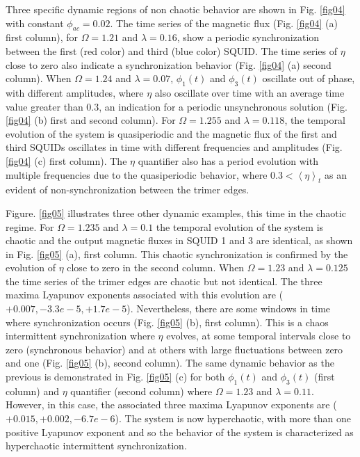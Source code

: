 \documentclass[aps,pre,reprint,groupedaddress]{revtex4-1}
\begin{document}
Three specific dynamic regions of non chaotic behavior are shown in Fig. \ref{fig04} with constant $\phi_{ac} = 0.02$. The time series of the magnetic flux (Fig. \ref{fig04} (a) first column), for $\Omega = 1.21$ and $\lambda=0.16$, show a periodic synchronization between the first (red color) and third (blue color) SQUID. The time series of $\eta$ close to zero also indicate a synchronization behavior (Fig. \ref{fig04} (a) second column). When $\Omega = 1.24$ and $\lambda=0.07$, $\phi_{1}(t)$ and $\phi_{3}(t)$ oscillate out of phase, with different amplitudes, where $\eta$ also oscillate over time with an average time value greater than $0.3$, an indication for a periodic unsynchronous solution (Fig. \ref{fig04} (b) first and second column). For $\Omega = 1.255$ and $\lambda=0.118$, the temporal evolution of the system is quasiperiodic and the magnetic flux of the first and third SQUIDs oscillates in time with different frequencies and amplitudes (Fig. \ref{fig04} (c) first column). The $\eta$ quantifier also has a period evolution with multiple frequencies due to the quasiperiodic behavior, where $ 0.3 < \left\langle \eta\right\rangle _{t}$ as an evident of non-synchronization between the trimer edges.

Figure. \ref{fig05} illustrates three other dynamic examples, this time in the chaotic regime. For $\Omega = 1.235$ and $\lambda=0.1$ the temporal evolution of the system is chaotic and the output magnetic fluxes in SQUID 1 and 3 are identical, as shown in Fig. \ref{fig05} (a), first column. This chaotic synchronization is confirmed by the evolution of $\eta$ close to zero in the second column. When  $\Omega = 1.23$ and $\lambda=0.125$ the time series of the trimer edges are chaotic but not identical. The three maxima Lyapunov exponents associated with this evolution are ($+0.007, -3.3e-5, +1.7e-5$). Nevertheless, there are some windows in time where synchronization occurs (Fig. \ref{fig05} (b), first column). This is a chaos intermittent synchronization where $\eta$ evolves, at some temporal intervals close to zero (synchronous behavior) and at others with large fluctuations between zero and one (Fig. \ref{fig05} (b), second column). The same dynamic behavior as the previous is demonstrated in Fig. \ref{fig05} (c) for both $\phi_{1}(t)$ and $\phi_{3}(t)$ (first column) and $\eta$ quantifier (second column) where $\Omega = 1.23$ and $\lambda=0.11$. However, in this case, the associated three maxima Lyapunov exponents are ($+0.015, +0.002, -6.7e-6$). The system is now hyperchaotic, with more than one positive Lyapunov exponent and so the behavior of the system is characterized as hyperchaotic intermittent synchronization.       
\end{document}

